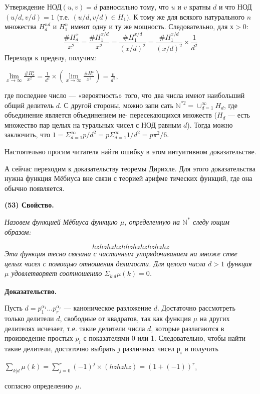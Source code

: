 \documentclass{mai_book}
\begin{document}
Утверждение НОД$(u,v) = d$ равносильно тому, что $u$ и $v$ кратны
$d$ и что НОД$(u/d,v/d) = 1$ (т.е. $(u/d,v/d)\in H_{1})$. К тому же для
всякого натурального $n$ множества $H_{d}^{nd}$ и  $H_{1}^n$ имеют одну и ту же
мощность. Следовательно, для $х > 0$:
$$\frac{\#H_{d}^x}{x^2}=\frac{\#H_{1}^{x/d}}{x^2}=\frac{\#H_{1}^{x/d}}{(x/d)^2}=\frac{\#H_{1}^{x/d}}{(x/d)^2}\times\frac{1}{d^2}$$
Переходя к пределу, получим:
\begin{center}
$\lim\limits_{x\to\infty}\frac{\#H_{d}^x}{x^2}=\frac{1}{d^2}\times\left(\lim\limits_{x\to\infty}\frac{\#H_{1}^x}{x^2} \right) = \frac{p}{d^2}$,
\end{center}
где последнее число — «вероятность» того, что два числа имеют
наибольший общий делитель $d$. С другой стороны, можно запи­
сать $\mathbb{N}^{*2}=\cup_{d=1}^{\infty}H_{d}$, где
 объединение является объединением не-
пересекающихся множеств ($H_{d}$ — есть множество пар целых на­
туральных чисел с НОД равным $d$). Тогда можно заключить, что\linebreak
$1 =\Sigma_{d=1}^{\infty} p/d^2 = p\Sigma_{d=1}^{\infty}1/d^2=p\pi^2/6$.

Настоятельно просим читателя найти ошибку в этом интуитивном
доказательстве.

А сейчас переходим к доказательству теоремы Дирихле. Для этого
доказательства нужна функция Мёбиуса вне связи с теорией арифме­
тических функций, где она обычно появляется.

\textbf{(53) Свойство.}

\textit{Назовем функцией Мёбиуса функцию $\mu$, определенную на $\mathbb{N}^{*}$ следу­
ющим образом:
}

$$hzhzhzhzhhzhzhzhzhzhz$$
\newpage
\textit{Эта функция тесно связана с частичным упорядочиванием на множе­
стве целых чисел с помощью отношения делимости. Для целого числа
$d>1$ функция $\mu$ удовлетворяет соотношению $\Sigma_{k|d}\mu(k)=0$.}

\textbf{Доказательство.}

Пусть $d=p_{1}^{\alpha_{1}}\ldots p_{r}^{\alpha_{r}}$
 — каноническое разложение $d$. Достаточно
рассмотреть только делители $d$, свободные от квадратов, так как
функция $\mu$ на других делителях исчезает, т.е. такие делители числа
$d$, которые разлагаются в произведение простых $p_{i}$ с показателями
0 или 1. Следовательно, чтобы найти такие делители, достаточно
выбрать $j$ различных чисел $р_{i}$ и получить
\begin{center}
$\sum\limits_{k|d}\mu(k)=\sum\limits_{j=0}^r(-1)^j\times (hzhzhz) =(1+(-1))^r$,
\end{center}
согласно определению $\mu$.
\end{document}
